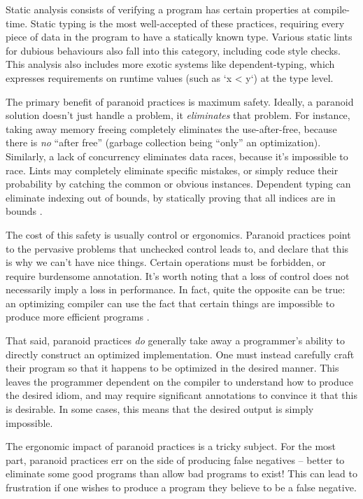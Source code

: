 Static analysis consists of verifying a program has certain properties at
compile-time. Static typing is the most well-accepted of these practices,
requiring every piece of data in the program to have a statically known type.
Various static lints for dubious behaviours also fall into this category,
including code style checks. This analysis also includes more exotic systems
like dependent-typing, which expresses requirements on runtime values (such as
`x < y`) at the type level.

The primary benefit of paranoid practices is maximum safety. Ideally, a paranoid
solution doesn't just handle a problem, it \emph{eliminates} that problem. For
instance, taking away memory freeing completely eliminates the use-after-free,
because there is \emph{no} ``after free'' (garbage collection being ``only'' an
optimization). Similarly, a lack of concurrency eliminates data races, because
it's impossible to race. Lints may completely eliminate specific mistakes, or
simply reduce their probability by catching the common or obvious instances.
Dependent typing can eliminate indexing out of bounds, by statically proving
that all indices are in bounds \cite{xi1998eliminating}.

The cost of this safety is usually control or ergonomics. Paranoid practices point to the pervasive
problems that unchecked control leads to, and declare that this is why we can't have nice
things. Certain operations must be forbidden, or require burdensome annotation.
It's worth noting that a loss of control does not necessarily imply a
loss in performance. In fact, quite the opposite can be true: an optimizing
compiler can use the fact that certain things are impossible to produce more
efficient programs \cite{coutts2007stream}.

That said, paranoid practices \emph{do} generally take away a programmer's ability to
directly construct an optimized implementation. One must instead carefully craft
their program so that it happens to be optimized in the desired manner. This
leaves the programmer dependent on the compiler to understand how to produce the
desired idiom, and may require significant annotations to convince it that this
is desirable. In some cases, this means that the desired output is simply
impossible.

The ergonomic impact of paranoid practices is a tricky subject. For the most
part, paranoid practices err on the side of producing false negatives -- better to
eliminate some good programs than allow bad programs to exist! This can lead to
frustration if one wishes to produce a program they believe to be a false
negative.

